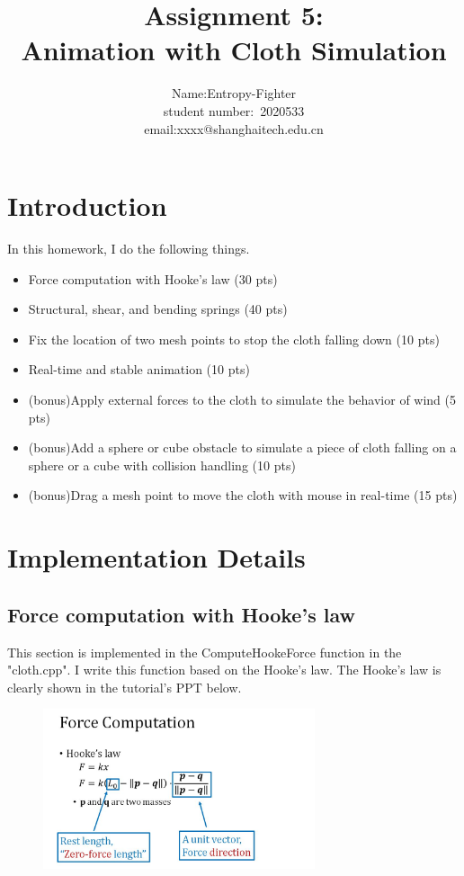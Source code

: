 \documentclass[acmtog]{acmart}
\title{Assignment 5:\\ {Animation with Cloth Simulation}}
\author{Name:\quad Entropy-Fighter\\ student number:\ 2020533
\\email:\quad xxxx@shanghaitech.edu.cn}
\begin{document}
\maketitle

\vspace*{2 ex}

\section{Introduction}
In this homework, I do the following things.
\begin{itemize}
	\item Force computation with Hooke's law (30 pts)
	\item Structural, shear, and bending springs (40 pts)
	\item Fix the location of two mesh points to stop the cloth falling down (10 pts)
	\item Real-time and stable animation (10 pts)
	\item (bonus)Apply external forces to the cloth to simulate the behavior of wind (5 pts)
	\item (bonus)Add a sphere or cube obstacle to simulate a piece of cloth falling on a sphere or a cube with collision handling (10 pts)
	\item (bonus)Drag a mesh point to move the cloth with mouse in real-time (15 pts)
\end{itemize}
\section{Implementation Details}
\subsection{Force computation with Hooke's law}
\quad This section is implemented in the ComputeHookeForce function in the "cloth.cpp". I write this function based on the Hooke's law.
The Hooke's law is clearly shown in the tutorial's PPT below.
\begin{figure}[h]
	\centering
	{\includegraphics[width=8cm]{hook.JPG}}	
\end{figure}
\end{document}
